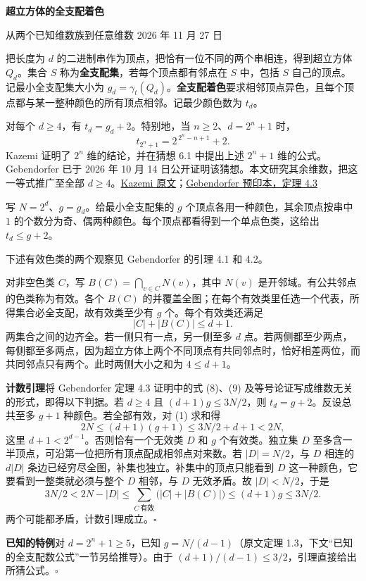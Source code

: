 \documentclass[11pt,a4paper]{article}
\newcommand{\sect}[1]{\par\vspace{4pt}{\large\sffamily\bfseries\color{accent}#1}\par}
\newcommand{\subh}[1]{\par\textbf{#1}\quad}
\newcommand{\finish}{\hfill$\square$}
\begin{document}
\color{ink}
{\sffamily\bfseries\LARGE 超立方体的全支配着色}\par
{\sffamily\small 从两个已知维数族到任意维数 \hfill 2026 年 11 月 27 日}
\par\smallskip
把长度为 $d$ 的二进制串作为顶点，把恰有一位不同的两个串相连，得到超立方体 $Q_d$。集合 $S$ 称为\textbf{全支配集}，若每个顶点都有邻点在 $S$ 中，包括 $S$ 自己的顶点。记最小全支配集大小为 $g_d=\gamma_t(Q_d)$。\textbf{全支配着色}要求相邻顶点异色，且每个顶点都与某一整种颜色的所有顶点相邻。记最少颜色数为 $t_d$。

\sect{定理}
对每个 $d\ge4$，有 $t_d=g_d+2$。特别地，当 $n\ge2$、$d=2^n+1$ 时，
\[
  \boxed{\quad t_{2^n+1}=2^{\,2^n-n+1}+2.\quad}
\]
Kazemi 证明了 $2^n$ 维的结论，并在猜想 6.1 中提出上述 $2^n+1$ 维的公式。Gebendorfer 已于 2026 年 10 月 14 日公开证明该猜想。本文研究其余维数，把这一等式推广至全部 $d\ge4$。\href{https://doi.org/10.47443/cm.2025.102}{Kazemi 原文}；\href{https://doi.org/10.13140/RG.2.2.31321.28006}{Gebendorfer 预印本，定理 4.3}

\sect{为什么还需要两种颜色}
写 $N=2^d$、$g=g_d$。给最小全支配集的 $g$ 个顶点各用一种颜色，其余顶点按串中 $1$ 的个数分为奇、偶两种颜色。每个顶点都看得到一个单点色类，这给出 $t_d\le g+2$。

下述有效色类的两个观察见 Gebendorfer 的引理 4.1 和 4.2。

对非空色类 $C$，写 $B(C)=\bigcap_{v\in C}N(v)$，其中 $N(v)$ 是开邻域。有公共邻点的色类称为有效。各个 $B(C)$ 的并覆盖全图；在每个有效类里任选一个代表，所得集合必全支配，故有效类至少有 $g$ 个。每个有效类还满足
\[
                |C|+|B(C)|\le d+1. \tag{1}
\]
两集合之间的边齐全。若一侧只有一点，另一侧至多 $d$ 点。若两侧都至少两点，每侧都至多两点，因为超立方体上两个不同顶点有共同邻点时，恰好相差两位，而共同邻点只有两个。此时两侧大小之和为 $4\le d+1$。

\subh{计数引理}将 Gebendorfer 定理 4.3 证明中的式 (8)、(9) 及等号论证写成维数无关的形式，即得以下判据。若 $d\ge4$ 且 $(d+1)g\le 3N/2$，则 $t_d=g+2$。反设总共至多 $g+1$ 种颜色。若全部有效，对 (1) 求和得
\[
             2N\le(d+1)(g+1)\le 3N/2+d+1<2N,
\]
这里 $d+1<2^{d-1}$。否则恰有一个无效类 $D$ 和 $g$ 个有效类。独立集 $D$ 至多含一半顶点，可沿第一位把所有顶点配成相邻点对来数。若 $|D|=N/2$，与 $D$ 相连的 $d|D|$ 条边已经穷尽全图，补集也独立。补集中的顶点只能看到 $D$ 这一种颜色，它要看到一整类就必须与整个 $D$ 相邻，与 $D$ 无效矛盾。故 $|D|<N/2$，于是
\[
  3N/2<2N-|D|\le\sum_{C\ \text{有效}} \bigl(|C|+|B(C)|\bigr)\le(d+1)g\le3N/2.
\]
两个可能都矛盾，计数引理成立。\finish

\subh{已知的特例}对 $d=2^n+1\ge5$，已知 $g=N/(d-1)$（原文定理 1.3，下文“已知的全支配数公式”一节另给推导）。由于 $(d+1)/(d-1)\le3/2$，引理直接给出所猜公式。\finish
\end{document}
